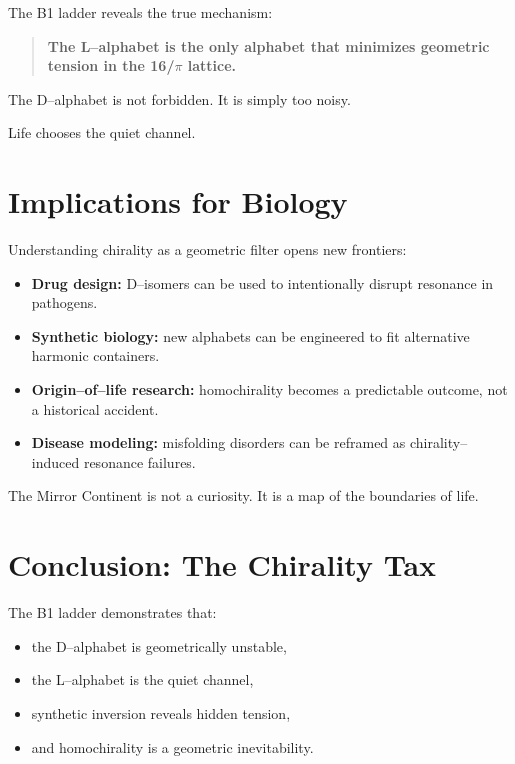 \documentclass[11pt, letterpaper, openany]{book}
\begin{document}
The B1 ladder reveals the true mechanism:

\begin{quote}
\textbf{The L–alphabet is the only alphabet that minimizes geometric tension in
the 16/$\pi$ lattice.}
\end{quote}

The D–alphabet is not forbidden.  
It is simply too noisy.

Life chooses the quiet channel.

\section{Implications for Biology}

Understanding chirality as a geometric filter opens new frontiers:

\begin{itemize}
    \item \textbf{Drug design:} D–isomers can be used to intentionally disrupt
          resonance in pathogens.

    \item \textbf{Synthetic biology:} new alphabets can be engineered to fit
          alternative harmonic containers.

    \item \textbf{Origin–of–life research:} homochirality becomes a predictable
          outcome, not a historical accident.

    \item \textbf{Disease modeling:} misfolding disorders can be reframed as
          chirality–induced resonance failures.
\end{itemize}

The Mirror Continent is not a curiosity.  
It is a map of the boundaries of life.

\section*{Conclusion: The Chirality Tax}

The B1 ladder demonstrates that:

\begin{itemize}
    \item the D–alphabet is geometrically unstable,
    \item the L–alphabet is the quiet channel,
    \item synthetic inversion reveals hidden tension,
    \item and homochirality is a geometric inevitability.
\end{itemize}
\end{document}
